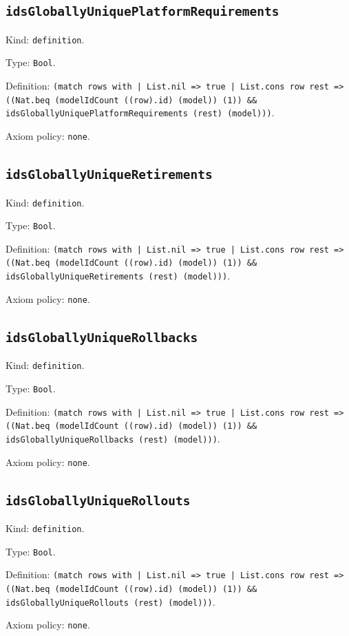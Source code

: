 \documentclass[11pt]{article}
\begin{document}
\subsection*{\texttt{idsGloballyUniquePlatformRequirements}}
\noindent Kind: \texttt{definition}.\par
\noindent Type: \texttt{Bool}.\par
\noindent Definition: \texttt{(match rows with | List.nil => true | List.cons row rest => ((Nat.beq (modelIdCount ((row).id) (model)) (1)) \&\& idsGloballyUniquePlatformRequirements (rest) (model)))}.\par
\noindent Axiom policy: \texttt{none}.\par
\subsection*{\texttt{idsGloballyUniqueRetirements}}
\noindent Kind: \texttt{definition}.\par
\noindent Type: \texttt{Bool}.\par
\noindent Definition: \texttt{(match rows with | List.nil => true | List.cons row rest => ((Nat.beq (modelIdCount ((row).id) (model)) (1)) \&\& idsGloballyUniqueRetirements (rest) (model)))}.\par
\noindent Axiom policy: \texttt{none}.\par
\subsection*{\texttt{idsGloballyUniqueRollbacks}}
\noindent Kind: \texttt{definition}.\par
\noindent Type: \texttt{Bool}.\par
\noindent Definition: \texttt{(match rows with | List.nil => true | List.cons row rest => ((Nat.beq (modelIdCount ((row).id) (model)) (1)) \&\& idsGloballyUniqueRollbacks (rest) (model)))}.\par
\noindent Axiom policy: \texttt{none}.\par
\subsection*{\texttt{idsGloballyUniqueRollouts}}
\noindent Kind: \texttt{definition}.\par
\noindent Type: \texttt{Bool}.\par
\noindent Definition: \texttt{(match rows with | List.nil => true | List.cons row rest => ((Nat.beq (modelIdCount ((row).id) (model)) (1)) \&\& idsGloballyUniqueRollouts (rest) (model)))}.\par
\noindent Axiom policy: \texttt{none}.\par
\end{document}
